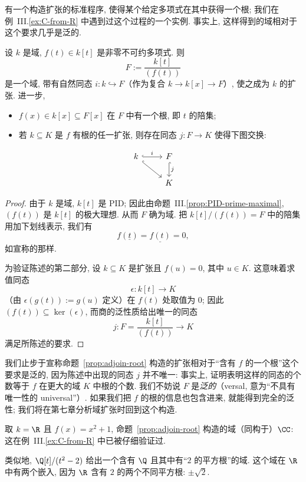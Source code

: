 有一个构造扩张的标准程序, 使得某个给定多项式在其中获得一个根; 我们在例~III.\ref{ex:C-from-R} 中遇到过这个过程的一个实例. 事实上, 这样得到的域相对于这个要求几乎是泛的.

\begin{proposition}\label{prop:adjoin-root}
设 $k$ 是域, $f(t)\in k[t]$ 是非零不可约多项式. 则
\[
F:=\frac{k[t]}{(f(t))}
\]
是一个域, 带有自然同态 $i:k\hookrightarrow F$（作为复合 $k\to k[x]\to F$）, 使之成为 $k$ 的扩张. 进一步,
\begin{itemize}
\item $f(x)\in k[x]\subseteq F[x]$ 在 $F$ 中有一个根, 即 $t$ 的陪集;
\item 若 $k\subseteq K$ 是 $f$ 有根的任一扩张, 则存在同态 $j:F\to K$ 使得下图交换:
\end{itemize}
\[
\begin{tikzcd}
k \arrow[r, hook, "i"] \arrow[dr,hook] & F \arrow[d,hook, "j"] \\
& K
\end{tikzcd}
\]
\end{proposition}

\begin{proof}
由于 $k$ 是域, $k[t]$ 是 PID; 因此由命题~III.\ref{prop:PID-prime-maximal}, $(f(t))$ 是 $k[t]$ 的极大理想. 从而 $F$ 确为域. 把 $k[t]/(f(t))=F$ 中的陪集用加下划线表示, 我们有
\[
f(\underline{t})=\underline{f(t)}=0,
\]
如宣称的那样.

为验证陈述的第二部分, 设 $k\subseteq K$ 是扩张且 $f(u)=0$, 其中 $u\in K$. 这意味着求值同态
\[
\epsilon:k[t]\to K
\]
（由 $\epsilon(g(t)):=g(u)$ 定义）在 $f(t)$ 处取值为 $0$; 因此 $(f(t))\subseteq\ker(\epsilon)$, 而商的泛性质给出唯一的同态
\[
j:F=\frac{k[t]}{(f(t))}\to K
\]
满足所陈述的要求.
\end{proof}

我们止步于宣称命题~\ref{prop:adjoin-root} 构造的扩张相对于``含有 $f$ 的一个根''这个要求是泛的, 因为陈述中出现的同态 $j$ 并不唯一: 事实上, 证明表明这样的同态的个数等于 $f$ 在更大的域 $K$ 中根的个数. 我们不妨说 $F$ 是\emph{泛的}（versal, 意为``不具有唯一性的 universal''）. 如果我们把 $f$ 的根的信息也包含进来, 就能得到完全的泛性; 我们将在第七章分析域扩张时回到这个构造.

\begin{example}\label{ex:adjoin-root-C}
取 $k=\R$ 且 $f(x)=x^2+1$, 命题~\ref{prop:adjoin-root} 构造的域（同构于）$\CC$: 这在例~III.\ref{ex:C-from-R} 中已被仔细验证过.

类似地, $\Q[t]/(t^2-2)$ 给出一个含有 $\Q$ 且其中有``$2$ 的平方根''的域. 这个域在 $\R$ 中有两个嵌入, 因为 $\R$ 含有 $2$ 的两个不同平方根: $\pm\sqrt{2}$.
\end{example}


